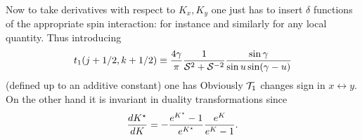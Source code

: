 %
Now to take derivatives with respect to $K_x,K_y$ one just has to insert
$\delta$ functions of the appropriate spin interaction: for instance
%
\eqn{}
%
and similarly for any local quantity.  Thus introducing
$$
t_1(j+1/2,k+1/2)\equiv{4\gamma\over\pi}
{1\over {\cal S}^2+{\cal S}^{-2}}{\sin\gamma\over\sin u\sin(\gamma-u)}
$$
%
\eqn{}
%
(defined up to an additive constant) one has
%
\eqn{}
%
Obviously ${\cal T}_1$ changes sign in $x\leftrightarrow y$. On the other hand
it is invariant in duality transformations since
$$
{dK^\star\over dK}=-{e^{K^\star}-1\over e^{K^\star}}{e^K\over e^K-1}.
$$

